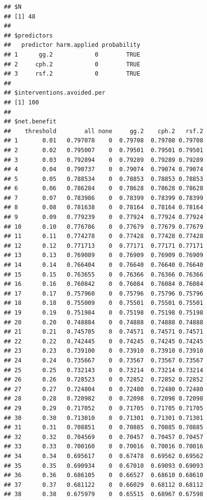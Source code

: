 \documentclass{article}\usepackage[]{graphicx}\usepackage[]{color}
\makeatletter
\newenvironment{kframe}{%
 \def\at@end@of@kframe{}%
 \ifinner\ifhmode%
  \def\at@end@of@kframe{\end{minipage}}%
  \begin{minipage}{\columnwidth}%
 \fi\fi%
 \def\FrameCommand##1{\hskip\@totalleftmargin \hskip-\fboxsep
 \colorbox{shadecolor}{##1}\hskip-\fboxsep
     \hskip-\linewidth \hskip-\@totalleftmargin \hskip\columnwidth}%
 \MakeFramed {\advance\hsize-\width
   \@totalleftmargin\z@ \linewidth\hsize
   \@setminipage}}%
 {\par\unskip\endMakeFramed%
 \at@end@of@kframe}
\newenvironment{knitrout}{}{} %
\makeatother
\begin{document}
\begin{knitrout}
\begin{kframe}\begin{verbatim}
## $N
## [1] 48
## 
## $predictors
##   predictor harm.applied probability
## 1      gg.2            0        TRUE
## 2     cph.2            0        TRUE
## 3     rsf.2            0        TRUE
## 
## $interventions.avoided.per
## [1] 100
## 
## $net.benefit
##    threshold        all none     gg.2    cph.2   rsf.2
## 1       0.01   0.797078    0  0.79708  0.79708 0.79708
## 2       0.02   0.795007    0  0.79501  0.79501 0.79501
## 3       0.03   0.792894    0  0.79289  0.79289 0.79289
## 4       0.04   0.790737    0  0.79074  0.79074 0.79074
## 5       0.05   0.788534    0  0.78853  0.78853 0.78853
## 6       0.06   0.786284    0  0.78628  0.78628 0.78628
## 7       0.07   0.783986    0  0.78399  0.78399 0.78399
## 8       0.08   0.781638    0  0.78164  0.78164 0.78164
## 9       0.09   0.779239    0  0.77924  0.77924 0.77924
## 10      0.10   0.776786    0  0.77679  0.77679 0.77679
## 11      0.11   0.774278    0  0.77428  0.77428 0.77428
## 12      0.12   0.771713    0  0.77171  0.77171 0.77171
## 13      0.13   0.769089    0  0.76909  0.76909 0.76909
## 14      0.14   0.766404    0  0.76640  0.76640 0.76640
## 15      0.15   0.763655    0  0.76366  0.76366 0.76366
## 16      0.16   0.760842    0  0.76084  0.76084 0.76084
## 17      0.17   0.757960    0  0.75796  0.75796 0.75796
## 18      0.18   0.755009    0  0.75501  0.75501 0.75501
## 19      0.19   0.751984    0  0.75198  0.75198 0.75198
## 20      0.20   0.748884    0  0.74888  0.74888 0.74888
## 21      0.21   0.745705    0  0.74571  0.74571 0.74571
## 22      0.22   0.742445    0  0.74245  0.74245 0.74245
## 23      0.23   0.739100    0  0.73910  0.73910 0.73910
## 24      0.24   0.735667    0  0.73567  0.73567 0.73567
## 25      0.25   0.732143    0  0.73214  0.73214 0.73214
## 26      0.26   0.728523    0  0.72852  0.72852 0.72852
## 27      0.27   0.724804    0  0.72480  0.72480 0.72480
## 28      0.28   0.720982    0  0.72098  0.72098 0.72098
## 29      0.29   0.717052    0  0.71705  0.71705 0.71705
## 30      0.30   0.713010    0  0.71301  0.71301 0.71301
## 31      0.31   0.708851    0  0.70885  0.70885 0.70885
## 32      0.32   0.704569    0  0.70457  0.70457 0.70457
## 33      0.33   0.700160    0  0.70016  0.70016 0.70016
## 34      0.34   0.695617    0  0.67478  0.69562 0.69562
## 35      0.35   0.690934    0  0.67010  0.69093 0.69093
## 36      0.36   0.686105    0  0.66527  0.68610 0.68610
## 37      0.37   0.681122    0  0.66029  0.68112 0.68112
## 38      0.38   0.675979    0  0.65515  0.68967 0.67598

\end{verbatim}
\end{kframe}
\end{knitrout}
\end{document}
